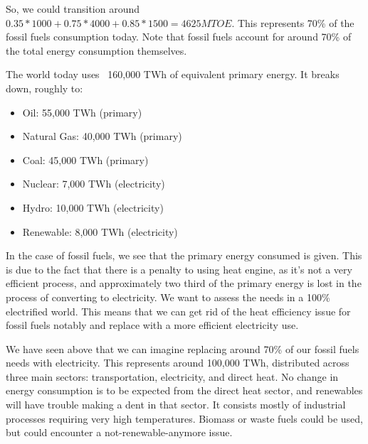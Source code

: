 


So, we could transition around $0.35 * 1000 + 0.75 * 4000 + 0.85 * 1500 = 4625 MTOE$. This represents 70\% of the fossil fuels consumption today. Note that fossil fuels account for around 70\% of the total energy consumption themselves.




The world today uses ~160,000 TWh of equivalent primary energy. It breaks down, roughly to:

\begin{itemize}
\item Oil: 55,000 TWh (primary)
\item Natural Gas: 40,000 TWh (primary)
\item Coal: 45,000 TWh (primary)
\item Nuclear: 7,000 TWh (electricity)
\item Hydro: 10,000 TWh (electricity)
\item Renewable: 8,000 TWh (electricity)
\end{itemize}

In the case of fossil fuels, we see that the primary energy consumed is given. This is due to the fact that there is a penalty to using heat engine, as it's not a very efficient process, and approximately two third of the primary energy is lost in the process of converting to electricity. We want to assess the needs in a 100\% electrified world. This means that we can get rid of the heat efficiency issue for fossil fuels notably and replace with a more efficient electricity use.

We have seen above that we can imagine replacing around 70\% of our fossil fuels needs with electricity. This represents around 100,000 TWh, distributed across three main sectors: transportation, electricity, and direct heat. No change in energy consumption is to be expected from the direct heat sector, and renewables will have trouble making a dent in that sector. It consists mostly of industrial processes requiring very high temperatures. Biomass or waste fuels could be used, but could encounter a not-renewable-anymore issue.

